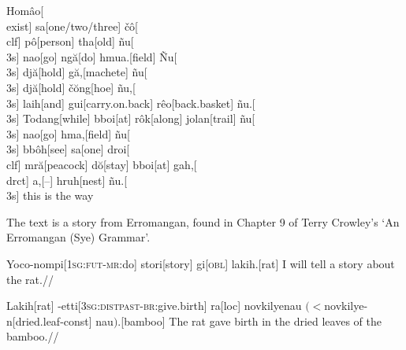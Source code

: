 \documentclass[12pt]{article}
\begin{document}
\null
\vskip6in

\noindent
\begingl
Hom\^{a}o[\\{exist}] sa[one/two/three]
\v{c}\^{o}[\\{clf}]
p\^{o}[person]
tha[old]
\~{n}u[\\{3s}]
nao[go]
ng\u{a}[do]
hmua.[field]
\~{N}u[\\{3s}]
dj\u{a}[hold]
g\u{a},[machete]
\~{n}u[\\{3s}]
dj\u{a}[hold]
\v{c}\u{o}ng[hoe]
\~{n}u,[\\{3s}]
laih[and]
gui[carry.on.back]
r\^{e}o[back.basket]
\~{n}u.[\\{3s}]
Todang[while]
bboi[at]
r\^{o}k[along]
jolan[trail]
\~{n}u[\\{3s}]
nao[go]
hma,[field]
\~{n}u[\\{3s}]
bb\^{o}h[see]
sa[one]
droi[\\{clf}]
mr\u{a}[peacock]
d\u{o}[stay]
bboi[at]
gah,[\\{drct}]
a,[--]
hruh[nest]
\~{n}u.[\\{3s}]
\endilg
this is the way
\endgl


\bigskip

\noindent
%
%
%
%
%
%
%
%
%
%
%
The text is a story from Erromangan, found in Chapter 9 of Terry
Crowley's `An Erromangan (Sye) Grammar'.

\bigskip
\exdisplay
\begingl
Yoco-nompi[\textsc{1sg:fut-mr:}do]
stori[story]
gi[\textsc{obl}]
lakih.[rat]
\endilg
\glft I will tell a story about the rat.//
\endgl
 \xe

\exdisplay
\begingl
Lakih[rat]
-etti[\textsc{3sg:distpast-br:}give.birth]
ra[\sc loc]
{novkilyenau $(<$novkilye-n}[dried.leaf-\sc const]
nau$)$.[bamboo]
\endilg
\glft The rat gave birth in the dried leaves of the bamboo.//
\endgl
\xe
\end{document}
